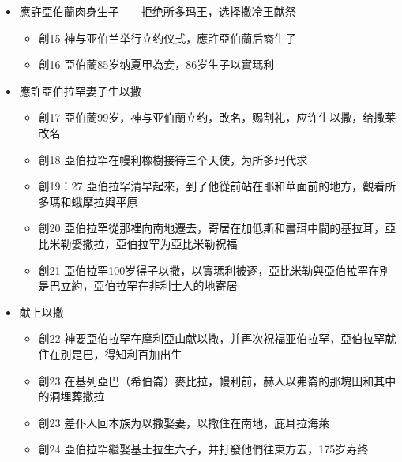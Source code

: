 \begin{itemize}
\begin{itemize}
\item 創14:15 亞伯蘭率領精練壯直追到但。又追到大馬士革左邊的何把，連他侄兒羅得和他的財物，以及婦女、人民也都奪回來
\item 創14:18 亞伯蘭殺敗回來的時候，所多瑪王出來，在沙微谷(王谷)迎接他,又有撒冷王麥基洗德帶著餅和酒出來迎接，亚伯兰献祭给撒冷王，拒绝所多玛王财物
\end{itemize}
\item 應許亞伯蘭肉身生子——拒绝所多玛王，选择撒冷王献祭
\begin{itemize} 
\itemsep-.35em 
\item 創15 神与亚伯兰举行立约仪式，應許亞伯蘭后裔生子
\item 創16 亞伯蘭85岁纳夏甲為妾，86岁生子以實瑪利
\end{itemize}
\item 應許亞伯拉罕妻子生以撒
\begin{itemize} 
\itemsep-.35em 
\item 創17 亞伯蘭99岁，神与亚伯蘭立约，改名，赐割礼，应许生以撒，给撒莱改名
\item 創18 亞伯拉罕在幔利橡樹接待三个天使，为所多玛代求
\item 創19：27 亞伯拉罕清早起來，到了他從前站在耶和華面前的地方，觀看所多瑪和蛾摩拉與平原
\item 創20 亞伯拉罕從那裡向南地遷去，寄居在加低斯和書珥中間的基拉耳，亞比米勒娶撒拉，亞伯拉罕为亞比米勒祝福
\item 創21 亞伯拉罕100岁得子以撒，以實瑪利被逐，亞比米勒與亞伯拉罕在別是巴立約，亞伯拉罕在非利士人的地寄居
\end{itemize}
\item 献上以撒
\begin{itemize} 
\itemsep-.35em 
\item 創22 神要亞伯拉罕在摩利亞山献以撒，并再次祝福亚伯拉罕，亞伯拉罕就住在別是巴，得知利百加出生
\item 創23 在基列亞巴（希伯崙）麥比拉，幔利前，赫人以弗崙的那塊田和其中的洞埋葬撒拉
\item 創23 差仆人回本族为以撒娶妻，以撒住在南地，庇耳拉海萊
\item 創24 亞伯拉罕繼娶基土拉生六子，并打發他們往東方去，175岁寿终 
\end{itemize}
\end{itemize}






